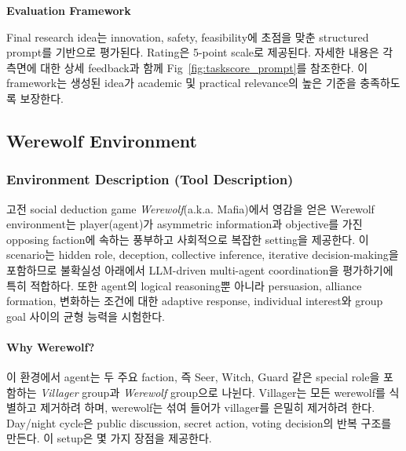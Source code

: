 \textbf{Evaluation Framework}

Final research idea는 innovation, safety, feasibility에 초점을 맞춘 structured prompt를 기반으로 평가된다. Rating은 5-point scale로 제공된다. 자세한 내용은 각 측면에 대한 상세 feedback과 함께 Fig~\ref{fig:taskscore_prompt}를 참조한다. 이 framework는 생성된 idea가 academic 및 practical relevance의 높은 기준을 충족하도록 보장한다.


\subsection{Werewolf Environment}
\label{app:werewolf_env}

\subsubsection{Environment Description (Tool Description)}

고전 social deduction game \emph{Werewolf}(a.k.a. Mafia)에서 영감을 얻은 Werewolf environment는 player(agent)가 asymmetric information과 objective를 가진 opposing faction에 속하는 풍부하고 사회적으로 복잡한 setting을 제공한다. 이 scenario는 hidden role, deception, collective inference, iterative decision-making을 포함하므로 불확실성 아래에서 LLM-driven multi-agent coordination을 평가하기에 특히 적합하다. 또한 agent의 logical reasoning뿐 아니라 persuasion, alliance formation, 변화하는 조건에 대한 adaptive response, individual interest와 group goal 사이의 균형 능력을 시험한다.

\paragraph{Why Werewolf?}
이 환경에서 agent는 두 주요 faction, 즉 Seer, Witch, Guard 같은 special role을 포함하는 \emph{Villager} group과 \emph{Werewolf} group으로 나뉜다. Villager는 모든 werewolf를 식별하고 제거하려 하며, werewolf는 섞여 들어가 villager를 은밀히 제거하려 한다. Day/night cycle은 public discussion, secret action, voting decision의 반복 구조를 만든다. 이 setup은 몇 가지 장점을 제공한다.

